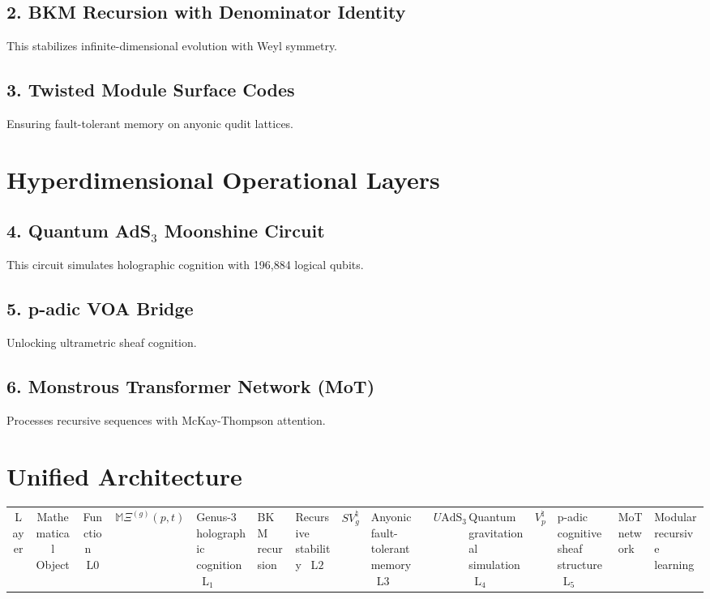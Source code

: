 \documentclass{article}
\theoremstyle{plain}
\begin{document}
\subsection{2. BKM Recursion with Denominator Identity}



This stabilizes infinite-dimensional evolution with Weyl symmetry.

\subsection{3. Twisted Module Surface Codes}



Ensuring fault-tolerant memory on anyonic qudit lattices.

\section{Hyperdimensional Operational Layers}
\subsection{4. Quantum AdS$_3$ Moonshine Circuit}



This circuit simulates holographic cognition with 196,884 logical qubits.

\subsection{5. p-adic VOA Bridge}



Unlocking ultrametric sheaf cognition.

\subsection{6. Monstrous Transformer Network (MoT)}



Processes recursive sequences with McKay-Thompson attention.

\section{Unified Architecture}
\begin{center}
\begin{tabular}{|c|c|c|}
\hline
Layer & Mathematical Object & Function \
\hline
L$0$ & $\mathbb{M}\Xi^{(g)}(p,t)$ & Genus-3 holographic cognition \
L$_1$ & BKM recursion & Recursive stability \
L$2$ & $S{V^{\natural}_g}$ & Anyonic fault-tolerant memory \
L$3$ & $U{\text{AdS}_3}$ & Quantum gravitational simulation \
L$_4$ & $V^{\natural}_p$ & p-adic cognitive sheaf structure \
L$_5$ & MoT network & Modular recursive learning \
\hline
\end{tabular}
\end{center}
\end{document}
